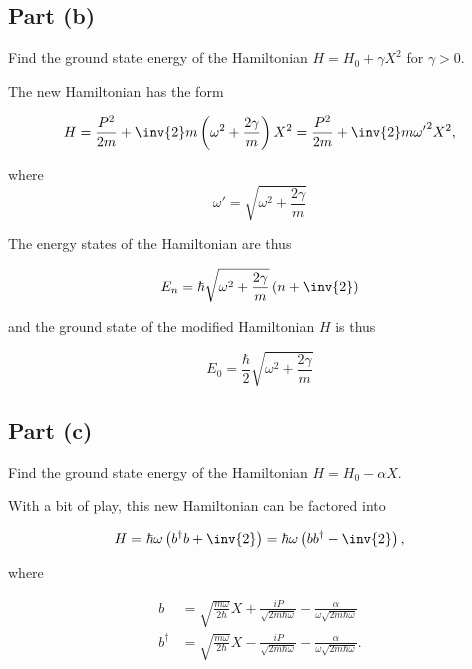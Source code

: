 \subsection{Part (b)}

Find the ground state energy of the Hamiltonian $H = H_0 + \gamma X^2$ for $\gamma > 0$.

The new Hamiltonian has the form

\begin{equation}\label{eqn:phy456ps1:520}
H = \frac{P^2}{2m} + \inv{2} m \left(\omega^2 + \frac{2 \gamma}{m} \right) X^2 =
\frac{P^2}{2m} + \inv{2} m {\omega'}^2 X^2,
\end{equation}

where
\begin{equation}\label{eqn:phy456ps1:540}
\omega' = \sqrt{ \omega^2 + \frac{2 \gamma}{m} }
\end{equation}

The energy states of the Hamiltonian are thus

\begin{equation}\label{eqn:phy456ps1:560}
E_n = \hbar \sqrt{ \omega^2 + \frac{2 \gamma}{m} } \left( n + \inv{2} \right)
\end{equation}

and the ground state of the modified Hamiltonian $H$ is thus

\begin{equation}\label{eqn:phy456ps1:580}
E_0 = \frac{\hbar}{2} \sqrt{ \omega^2 + \frac{2 \gamma}{m} }
\end{equation}

\subsection{Part (c)}

Find the ground state energy of the Hamiltonian $H = H_0 - \alpha X$.

With a bit of play, this new Hamiltonian can be factored into

\begin{equation}\label{eqn:phy456ps1:590}
H
= \hbar \omega \left( b^\dagger b + \inv{2} \right)
= \hbar \omega \left( b b^\dagger - \inv{2} \right),
\end{equation}

where

\begin{align}\label{eqn:phy456ps1:600}
b &= \sqrt{\frac{m \omega}{2\hbar}} X + \frac{i P}{\sqrt{2 m \hbar \omega}} - \frac{\alpha}{\omega \sqrt{ 2 m \hbar \omega }} \\
b^\dagger &= \sqrt{\frac{m \omega}{2\hbar}} X - \frac{i P}{\sqrt{2 m \hbar \omega}} - \frac{\alpha}{\omega \sqrt{ 2 m \hbar \omega }}.
\end{align}

